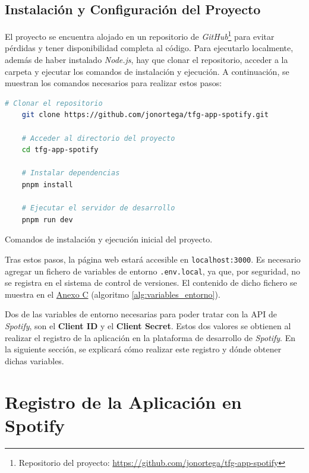 \subsection{Instalación y Configuración del Proyecto}

El proyecto se encuentra alojado en un repositorio de \textit{GitHub}\footnote{Repositorio del proyecto: \href{https://github.com/jonortega/tfg-app-spotify}{https://github.com/jonortega/tfg-app-spotify}} para evitar pérdidas y tener disponibilidad completa al código. Para ejecutarlo localmente, además de haber instalado \textit{Node.js}, hay que clonar el repositorio, acceder a la carpeta y ejecutar los comandos de instalación y ejecución. A continuación, se muestran los comandos necesarios para realizar estos pasos:

\begin{ifalgorithm}[H]
    \begin{lstlisting}[language=bash]
    # Clonar el repositorio
    git clone https://github.com/jonortega/tfg-app-spotify.git
    
    # Acceder al directorio del proyecto
    cd tfg-app-spotify
    
    # Instalar dependencias
    pnpm install
    
    # Ejecutar el servidor de desarrollo
    pnpm run dev
    \end{lstlisting}
    \caption{Comandos de instalación y ejecución inicial del proyecto.}
    \label{alg:instalacion_proyecto}
\end{ifalgorithm}

Tras estos pasos, la página web estará accesible en \texttt{localhost:3000}. Es necesario agregar un fichero de variables de entorno \texttt{.env.local}, ya que, por seguridad, no se registra en el sistema de control de versiones. El contenido de dicho fichero se muestra en el \hyperref[ch:anexoC]{Anexo C} (algoritmo \ref{alg:variables_entorno}).

Dos de las variables de entorno necesarias para poder tratar con la API de \textit{Spotify}, son el \textbf{Client ID} y el \textbf{Client Secret}. Estos dos valores se obtienen al realizar el registro de la aplicación en la plataforma de desarrollo de \textit{Spotify}. En la siguiente sección, se explicará cómo realizar este registro y dónde obtener dichas variables.

\newpage

\section{Registro de la Aplicación en Spotify}

